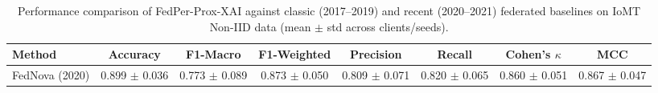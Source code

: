 \begin{table}[t]
\centering
\caption{Performance comparison of FedPer-Prox-XAI against classic (2017--2019) and recent (2020--2021) federated baselines on IoMT Non-IID data (mean $\pm$ std across clients/seeds).}
\label{tab:sota_comparison}
\begin{tabular}{lccccccc}
\toprule
Method & Accuracy & F1-Macro & F1-Weighted & Precision & Recall & Cohen's $\kappa$ & MCC \\
\midrule
FedNova (2020) & 0.899 $\pm$ 0.036 & 0.773 $\pm$ 0.089 & 0.873 $\pm$ 0.050 & 0.809 $\pm$ 0.071 & 0.820 $\pm$ 0.065 & 0.860 $\pm$ 0.051 & 0.867 $\pm$ 0.047 \\
\bottomrule
\end{tabular}
\end{table}
